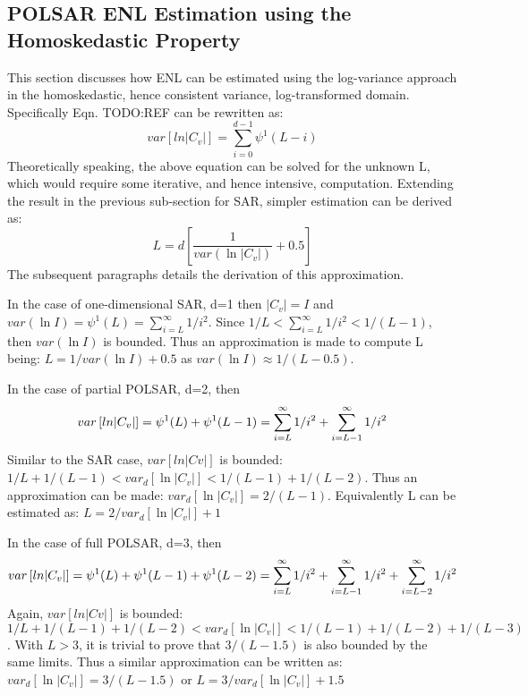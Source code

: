 \subsection{POLSAR ENL Estimation using the Homoskedastic Property}


This section discusses how ENL can be estimated using the log-variance approach in the homoskedastic, hence consistent variance, log-transformed domain.
Specifically Eqn. TODO:REF can be rewritten as:
\begin{equation}
  var \left[ ln|C_v| \right] = \sum^{d-1}_{i=0} \psi^1(L-i)
\end{equation}
Theoretically speaking, the above equation can be solved for the unknown L, which would require some iterative, and hence intensive, computation.
Extending the result in the previous sub-section for SAR, simpler estimation can be derived as:
\begin{equation}
  L = d \left[ \frac{1}{var(\ln|C_v|)} + 0.5 \right]
\end{equation}
The subsequent paragraphs details the derivation of this approximation.

In the case of one-dimensional SAR, d=1 then $|C_v|=I$ and
$var(\ln{I}) = \psi^1(L)=\sum^{\infty}_{i=L}1/i^2$.
Since $1/L < \sum^{\infty}_{i=L}1/i^2 < 1/(L-1)$, then $var(\ln{I})$ is bounded.
Thus an approximation is made to compute L being:
$L=1/var(\ln{I}) + 0.5 $ as $var(\ln{I}) \approx 1/(L-0.5)$.

In the case of partial POLSAR, d=2, then
\begin{equation}
  var \left[ ln|C_v| \right] = \psi^1(L) + \psi^1(L-1) \\
    = \sum^{\infty}_{i=L}1/i^2 + \sum^{\infty}_{i=L-1}1/i^2 \\    
\end{equation}
Similar to the SAR case, $var[ln|Cv|]$ is bounded: $1/L + 1/(L-1) < var_d \left[ \ln |C_v| \right] < 1/(L-1) + 1/(L-2)$.
Thus an approximation can be made: $var_d \left[ \ln |C_v| \right] = 2/(L-1)$.
Equivalently L can be estimated as:  $L = 2/var_d \left[ \ln |C_v| \right] + 1$

In the case of full POLSAR, d=3, then
\begin{equation}
  var \left[ ln|C_v| \right] = \psi^1(L) + \psi^1(L-1) + \psi^1(L-2) \\
    = \sum^{\infty}_{i=L}1/i^2 + \sum^{\infty}_{i=L-1}1/i^2  + \sum^{\infty}_{i=L-2}1/i^2 \\    
\end{equation}
Again, $var[ln|Cv|]$ is bounded: $1/L + 1/(L-1) + 1/(L-2) < var_d \left[ \ln |C_v| \right] < 1/(L-1) + 1/(L-2) + 1/(L-3)$.
With $L>3$, it is trivial to prove that $3/(L-1.5)$ is also bounded by the same limits. %
Thus a similar approximation can be written as: $var_d \left[ \ln |C_v| \right] = 3/(L-1.5)$
or $L = 3/var_d \left[ \ln |C_v| \right] + 1.5$

